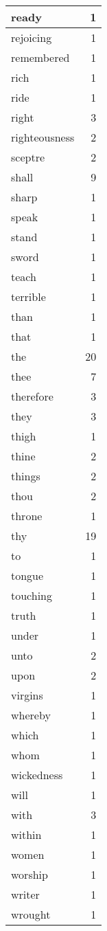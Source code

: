 \begin{center}
\begin{longtable}{l|r}
ready & 1\\ \hline 
rejoicing & 1\\ \hline 
remembered & 1\\ \hline 
rich & 1\\ \hline 
ride & 1\\ \hline 
right & 3\\ \hline 
righteousness & 2\\ \hline 
sceptre & 2\\ \hline 
shall & 9\\ \hline 
sharp & 1\\ \hline 
speak & 1\\ \hline 
stand & 1\\ \hline 
sword & 1\\ \hline 
teach & 1\\ \hline 
terrible & 1\\ \hline 
than & 1\\ \hline 
that & 1\\ \hline 
the & 20\\ \hline 
thee & 7\\ \hline 
therefore & 3\\ \hline 
they & 3\\ \hline 
thigh & 1\\ \hline 
thine & 2\\ \hline 
things & 2\\ \hline 
thou & 2\\ \hline 
throne & 1\\ \hline 
thy & 19\\ \hline 
to & 1\\ \hline 
tongue & 1\\ \hline 
touching & 1\\ \hline 
truth & 1\\ \hline 
under & 1\\ \hline 
unto & 2\\ \hline 
upon & 2\\ \hline 
virgins & 1\\ \hline 
whereby & 1\\ \hline 
which & 1\\ \hline 
whom & 1\\ \hline 
wickedness & 1\\ \hline 
will & 1\\ \hline 
with & 3\\ \hline 
within & 1\\ \hline 
women & 1\\ \hline 
worship & 1\\ \hline 
writer & 1\\ \hline 
wrought & 1\\ \hline 
\end{longtable}
\end{center}



